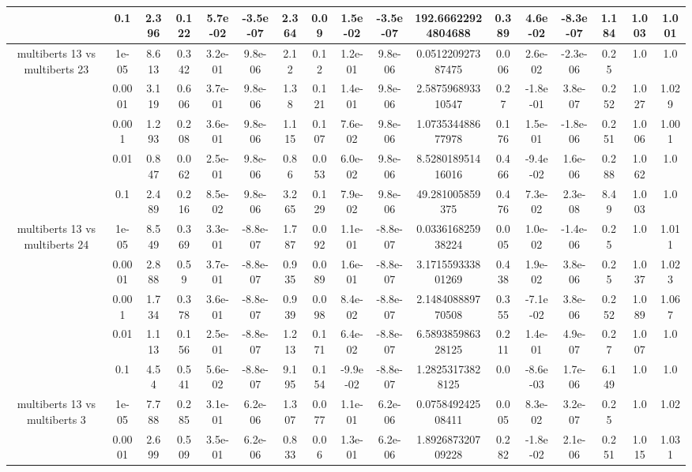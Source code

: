 \begin{tabular}{|c|c|c|c|c|c|c|c|c|c|c|c|c|c|c|c|c|}
 & 0.1 & 2.396 & 0.122 & 5.7e-02 & -3.5e-07 & 2.364 & 0.09 & 1.5e-02 & -3.5e-07 & 192.66622924804688 & 0.389 & 4.6e-02 & -8.3e-07 & 1.184 & 1.003 & 1.001 \\
\hline
\multirow{5}{*}{multiberts 13 vs multiberts 23} & 1e-05 & 8.613 & 0.342 & 3.2e-01 & 9.8e-06 & 2.12 & 0.12 & 1.2e-01 & 9.8e-06 & 0.051220927387475 & 0.006 & 2.6e-02 & -2.3e-06 & 0.25 & 1.0 & 1.0 \\
 & 0.0001 & 3.119 & 0.606 & 3.7e-01 & 9.8e-06 & 1.38 & 0.121 & 1.4e-01 & 9.8e-06 & 2.587596893310547 & 0.27 & -1.8e-01 & 3.8e-07 & 0.252 & 1.027 & 1.029 \\
 & 0.001 & 1.293 & 0.208 & 3.6e-01 & 9.8e-06 & 1.115 & 0.107 & 7.6e-02 & 9.8e-06 & 1.073534488677978 & 0.176 & 1.5e-01 & -1.8e-06 & 0.251 & 1.006 & 1.001 \\
 & 0.01 & 0.847 & 0.062 & 2.5e-01 & 9.8e-06 & 0.86 & 0.053 & 6.0e-02 & 9.8e-06 & 8.528018951416016 & 0.466 & -9.4e-02 & 1.6e-06 & 0.288 & 1.062 & 1.0 \\
 & 0.1 & 2.489 & 0.216 & 8.5e-02 & 9.8e-06 & 3.265 & 0.129 & 7.9e-02 & 9.8e-06 & 49.281005859375 & 0.476 & 7.3e-02 & 2.3e-08 & 8.49 & 1.003 & 1.0 \\
\hline
\multirow{5}{*}{multiberts 13 vs multiberts 24} & 1e-05 & 8.549 & 0.369 & 3.3e-01 & -8.8e-07 & 1.787 & 0.092 & 1.1e-01 & -8.8e-07 & 0.033616825938224 & 0.005 & 1.0e-02 & -1.4e-06 & 0.25 & 1.0 & 1.011 \\
 & 0.0001 & 2.888 & 0.59 & 3.7e-01 & -8.8e-07 & 0.935 & 0.089 & 1.6e-01 & -8.8e-07 & 3.171559333801269 & 0.438 & 1.9e-02 & 3.8e-06 & 0.25 & 1.037 & 1.023 \\
 & 0.001 & 1.734 & 0.378 & 3.6e-01 & -8.8e-07 & 0.939 & 0.098 & 8.4e-02 & -8.8e-07 & 2.148408889770508 & 0.355 & -7.1e-02 & 3.8e-06 & 0.252 & 1.089 & 1.067 \\
 & 0.01 & 1.113 & 0.156 & 2.5e-01 & -8.8e-07 & 1.213 & 0.171 & 6.4e-02 & -8.8e-07 & 6.589385986328125 & 0.211 & 1.4e-01 & 4.9e-07 & 0.27 & 1.007 & 1.0 \\
 & 0.1 & 4.54 & 0.541 & 5.6e-02 & -8.8e-07 & 9.195 & 0.154 & -9.9e-02 & -8.8e-07 & 1.28253173828125 & 0.0 & -8.6e-03 & 1.7e-06 & 6.149 & 1.0 & 1.0 \\
\hline
\multirow{5}{*}{multiberts 13 vs multiberts 3} & 1e-05 & 7.788 & 0.285 & 3.1e-01 & 6.2e-06 & 1.307 & 0.077 & 1.1e-01 & 6.2e-06 & 0.075849242508411 & 0.005 & 8.3e-02 & 3.2e-07 & 0.25 & 1.0 & 1.02 \\
 & 0.0001 & 2.699 & 0.509 & 3.5e-01 & 6.2e-06 & 0.833 & 0.06 & 1.3e-01 & 6.2e-06 & 1.892687320709228 & 0.282 & -1.8e-02 & 2.1e-06 & 0.251 & 1.015 & 1.031 \\

\end{tabular}
